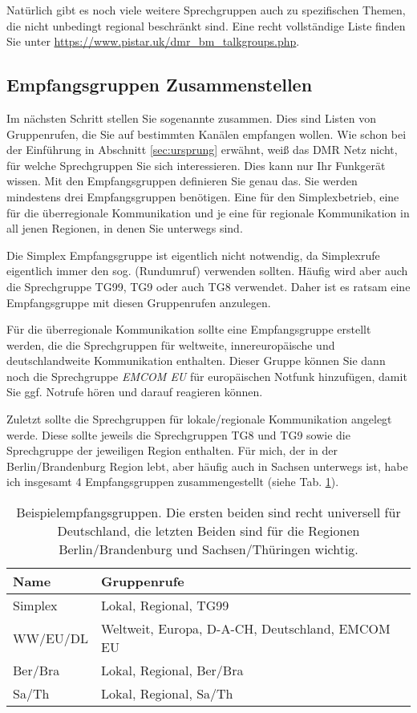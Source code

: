 Natürlich gibt es noch viele weitere Sprechgruppen auch zu spezifischen Themen, die nicht unbedingt regional beschränkt sind. Eine recht vollständige Liste finden Sie unter \url{https://www.pistar.uk/dmr_bm_talkgroups.php}.


\subsection{Empfangsgruppen Zusammenstellen} \label{sec:cp:grouplist}
Im nächsten Schritt stellen Sie sogenannte  zusammen. Dies sind Listen von Gruppenrufen, die Sie auf bestimmten Kanälen empfangen wollen. Wie schon bei der Einführung in Abschnitt \ref{sec:ursprung} erwähnt, weiß das DMR Netz nicht, für welche Sprechgruppen Sie sich interessieren. Dies kann nur Ihr Funkgerät wissen. Mit den Empfangsgruppen definieren Sie genau das. Sie werden mindestens drei Empfangsgruppen benötigen. Eine für den Simplexbetrieb, eine für die überregionale Kommunikation und je eine für regionale Kommunikation in all jenen Regionen, in denen Sie unterwegs sind.

Die Simplex Empfangsgruppe ist eigentlich nicht notwendig, da Simplexrufe eigentlich immer den sog.  (Rundumruf) verwenden sollten. Häufig wird aber auch die Sprechgruppe TG99, TG9 oder auch TG8 verwendet. Daher ist es ratsam eine Empfangsgruppe mit diesen Gruppenrufen anzulegen. 

Für die überregionale Kommunikation sollte eine Empfangsgruppe erstellt werden, die die Sprechgruppen für weltweite, innereuropäische und deutschlandweite Kommunikation enthalten. Dieser Gruppe können Sie dann noch die Sprechgruppe \emph{EMCOM EU} für europäischen Notfunk hinzufügen, damit Sie ggf. Notrufe hören und darauf reagieren können. 

Zuletzt sollte die Sprechgruppen für lokale/regionale Kommunikation angelegt werde. Diese sollte jeweils die Sprechgruppen TG8 und TG9 sowie die Sprechgruppe der jeweiligen Region enthalten. Für mich, der in der Berlin/Brandenburg Region lebt, aber häufig auch in Sachsen unterwegs ist, habe ich insgesamt 4 Empfangsgruppen zusammengestellt (siehe Tab. \ref{tab:grouplist}).
  
\begin{table}
 \centering
 \begin{tabular}{|l|l|} \hline
 Name     & Gruppenrufe \\ \hline
 Simplex  & Lokal, Regional, TG99 \\
 WW/EU/DL & Weltweit, Europa, D-A-CH, Deutschland, EMCOM EU \\
 Ber/Bra  & Lokal, Regional, Ber/Bra \\
 Sa/Th    & Lokal, Regional, Sa/Th \\ \hline
 \end{tabular}
 \caption{Beispielempfangsgruppen. Die ersten beiden sind recht universell für Deutschland, die letzten Beiden sind für die Regionen Berlin/Brandenburg und Sachsen/Thüringen wichtig.} \label{tab:grouplist}
\end{table}


